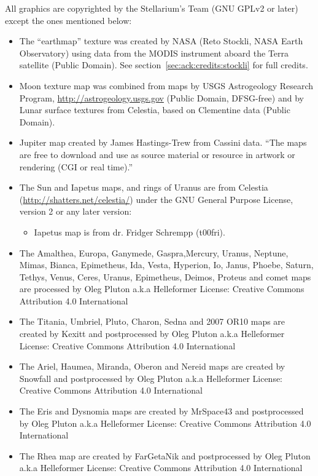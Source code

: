 All graphics are copyrighted by the Stellarium's Team (GNU GPLv2 or later) 
	except the ones mentioned below:
\begin{itemize}
\item The ``earthmap'' texture was created by NASA (Reto Stockli, NASA Earth
	 Observatory) using data from the MODIS instrument aboard the
	 Terra satellite (Public Domain). See section~\ref{sec:ack:credits:stockli} for full
	 credits.
\item Moon texture map was combined from maps by USGS Astrogeology Research
	 Program,
	 \url{http://astrogeology.usgs.gov} (Public Domain, DFSG-free) and by Lunar
	 surface textures from Celestia, based on Clementine data (Public
	 Domain).
\item Jupiter map created by James Hastings-Trew from Cassini data. ``The 
	 maps are free to download and use as source material or resource
	 in artwork or rendering (CGI or real time).''
\item The Sun and Iapetus maps, and rings of Uranus 
	 are from Celestia (\url{http://shatters.net/celestia/})
	 under the GNU General Purpose License, version 2 or any later
	 version:
\begin{itemize}	 
	 \item Iapetus map is from dr. Fridger Schrempp (t00fri).
\end{itemize}	 
\item The Amalthea, Europa, Ganymede, Gaspra,Mercury, Uranus, Neptune, Mimas,
	 Bianca, Epimetheus, Ida, Vesta, Hyperion, Io, Janus, Phoebe, Saturn, 
	 Tethys, Venus, Ceres, Uranus, Epimetheus, Deimos, Proteus and comet
   maps are processed by Oleg Pluton a.k.a Helleformer
	 License: Creative Commons Attribution 4.0 International
\item The Titania, Umbriel, Pluto, Charon, Sedna and 2007 OR10 maps are created
	 by Kexitt and postprocessed by Oleg Pluton a.k.a Helleformer
	 License: Creative Commons Attribution 4.0 International
\item The Ariel, Haumea, Miranda, Oberon and Nereid maps are created by 
	 Snowfall and postprocessed by Oleg Pluton a.k.a Helleformer
	 License: Creative Commons Attribution 4.0 International
\item The Eris and Dysnomia maps are created by MrSpace43 and postprocessed by 
	 Oleg Pluton a.k.a Helleformer
	 License: Creative Commons Attribution 4.0 International
\item The Rhea map are created by FarGetaNik and postprocessed by Oleg Pluton 
	 a.k.a Helleformer
	 License: Creative Commons Attribution 4.0 International

\end{itemize}
